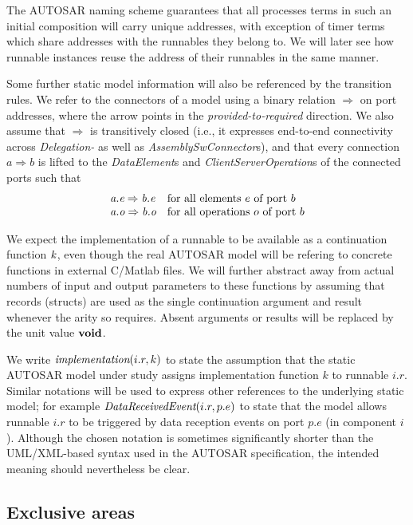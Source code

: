 \documentclass[twocolumn]{article}
\begin{document}
The AUTOSAR naming scheme guarantees that all processes terms in such an initial composition will carry unique addresses, with exception of timer terms which share addresses with the runnables they belong to. We will later see how runnable instances reuse the address of their runnables in the same manner.

Some further static model information will also be referenced by the transition rules. We refer to the connectors of a model using a binary relation $\Rightarrow$ on port addresses, where the arrow points in the \emph{provided-to-required} direction. We also assume that $\Rightarrow$ is transitively closed (i.e., it expresses end-to-end connectivity across \emph{Delegation-} as well as \emph{AssemblySwConnector}s), and that every connection $a \Rightarrow b$ is lifted to the \emph{DataElement}s and \emph{ClientServerOperation}s of the connected ports such that
\[
\begin{array}{lll}
  \Tconnect{\Tp{e}{a}}{\Tp{e}{b}} & \text{for all elements $e$ of port $b$} \\
  \Tconnect{\Tp{o}{a}}{\Tp{o}{b}} & \text{for all operations $o$ of port $b$} \\
\end{array}
\]

We expect the implementation of a runnable to be available as a continuation function $\Cont$, even though the real AUTOSAR model will be refering to concrete functions in external C/Matlab files. We will further abstract away from actual numbers of input and output parameters to these functions by assuming that records (structs) are used as the single continuation argument and result whenever the arity so requires. Absent arguments or results will be replaced by the unit value $\Tvoid$.

We write $\Timplementation{i.r}{k}$ to state the assumption that the static AUTOSAR model under study assigns implementation function $k$ to runnable $i.r$. Similar notations will be used to express other references to the underlying static model; for example $\emph{DataReceivedEvent}(i.r, p.e)$ to state that the model allows runnable $i.r$ to be triggered by data reception events on port $p.e$ (in component $i$). Although the chosen notation is sometimes significantly shorter than the UML/XML-based syntax used in the AUTOSAR specification, the intended meaning should nevertheless be clear.

\subsection{Exclusive areas}
\end{document}
